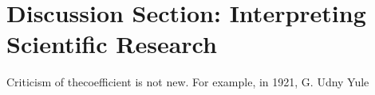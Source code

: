 \section{Discussion Section: Interpreting Scientific Research}

Criticism of thecoefficient is not new. For example, in 1921, G. Udny Yule